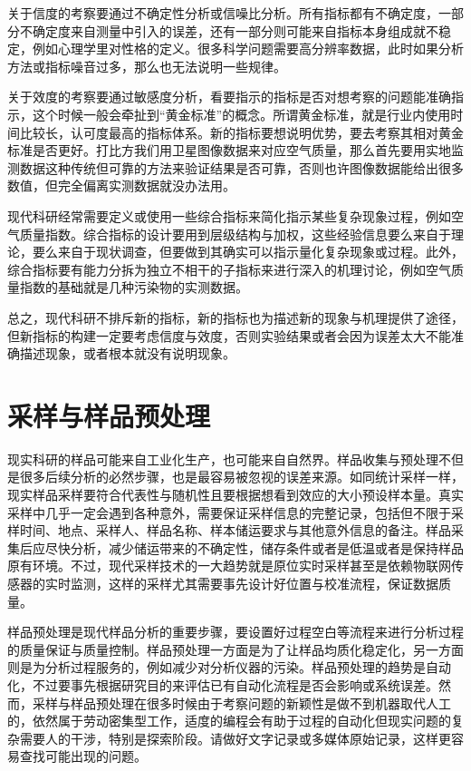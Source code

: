 \documentclass[]{tufte-book}
\begin{document}
关于信度的考察要通过不确定性分析或信噪比分析。所有指标都有不确定度，一部分不确定度来自测量中引入的误差，还有一部分则可能来自指标本身组成就不稳定，例如心理学里对性格的定义。很多科学问题需要高分辨率数据，此时如果分析方法或指标噪音过多，那么也无法说明一些规律。

关于效度的考察要通过敏感度分析，看要指示的指标是否对想考察的问题能准确指示，这个时候一般会牵扯到``黄金标准''的概念。所谓黄金标准，就是行业内使用时间比较长，认可度最高的指标体系。新的指标要想说明优势，要去考察其相对黄金标准是否更好。打比方我们用卫星图像数据来对应空气质量，那么首先要用实地监测数据这种传统但可靠的方法来验证结果是否可靠，否则也许图像数据能给出很多数值，但完全偏离实测数据就没办法用。

现代科研经常需要定义或使用一些综合指标来简化指示某些复杂现象过程，例如空气质量指数。综合指标的设计要用到层级结构与加权，这些经验信息要么来自于理论，要么来自于现状调查，但要做到其确实可以指示量化复杂现象或过程。此外，综合指标要有能力分拆为独立不相干的子指标来进行深入的机理讨论，例如空气质量指数的基础就是几种污染物的实测数据。

总之，现代科研不排斥新的指标，新的指标也为描述新的现象与机理提供了途径，但新指标的构建一定要考虑信度与效度，否则实验结果或者会因为误差太大不能准确描述现象，或者根本就没有说明现象。

\hypertarget{ux91c7ux6837ux4e0eux6837ux54c1ux9884ux5904ux7406}{%
\section{采样与样品预处理}\label{ux91c7ux6837ux4e0eux6837ux54c1ux9884ux5904ux7406}}

现实科研的样品可能来自工业化生产，也可能来自自然界。样品收集与预处理不但是很多后续分析的必然步骤，也是最容易被忽视的误差来源。如同统计采样一样，现实样品采样要符合代表性与随机性且要根据想看到效应的大小预设样本量。真实采样中几乎一定会遇到各种意外，需要保证采样信息的完整记录，包括但不限于采样时间、地点、采样人、样品名称、样本储运要求与其他意外信息的备注。样品采集后应尽快分析，减少储运带来的不确定性，储存条件或者是低温或者是保持样品原有环境。不过，现代采样技术的一大趋势就是原位实时采样甚至是依赖物联网传感器的实时监测，这样的采样尤其需要事先设计好位置与校准流程，保证数据质量。

样品预处理是现代样品分析的重要步骤，要设置好过程空白等流程来进行分析过程的质量保证与质量控制。样品预处理一方面是为了让样品均质化稳定化，另一方面则是为分析过程服务的，例如减少对分析仪器的污染。样品预处理的趋势是自动化，不过要事先根据研究目的来评估已有自动化流程是否会影响或系统误差。然而，采样与样品预处理在很多时候由于考察问题的新颖性是做不到机器取代人工的，依然属于劳动密集型工作，适度的编程会有助于过程的自动化但现实问题的复杂需要人的干涉，特别是探索阶段。请做好文字记录或多媒体原始记录，这样更容易查找可能出现的问题。
\end{document}
